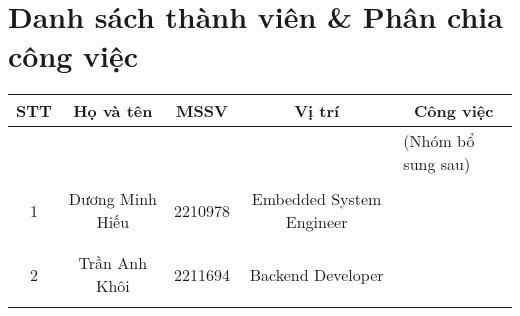 \section{Danh sách thành viên \& Phân chia công việc}
\renewcommand{\arraystretch}{1.4}
\begin{table}[H]
\begin{tabular}{|c|c|c|c|p{4cm}|}
\hline
\rowcolor[HTML]{EFEFEF} 
\textbf{STT}        & \textbf{Họ và tên}                        & \textbf{MSSV}                     & \textbf{Vị trí}                                           & \multicolumn{1}{c|}{\cellcolor[HTML]{EFEFEF}\textbf{Công việc}}   \\ \hline
                    &                                           &                                   &                                                           & (Nhóm bổ sung sau)                                                \\ \cline{5-5} 
                    &                                           &                                   &                                                           &                                                                   \\ \cline{5-5} 
\multirow{-3}{*}{1} & \multirow{-3}{*}{Dương Minh Hiếu}         & \multirow{-3}{*}{2210978}         & \multirow{-3}{3cm}{\centering Embedded System Engineer}              &                                                                   \\ \hline
                    &                                           &                                   &                                                           &                                                                   \\ \cline{5-5} 
                    &                                           &                                   &                                                           &                                                                   \\ \cline{5-5} 
\multirow{-3}{*}{2} & \multirow{-3}{*}{Trần Anh Khôi}           & \multirow{-3}{*}{2211694}         & \multirow{-3}{3cm}{\centering Backend Developer}                       &                                                                   \\ \hline
                    &                                           &                                   &                                                           &                                                                   \\ \cline{5-5} 

\end{tabular}
\end{table}
